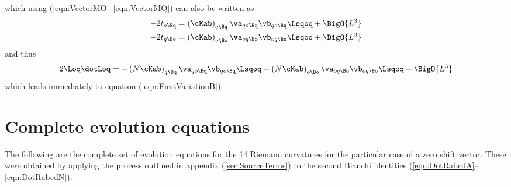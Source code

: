 \documentclass[a4paper,12pt]{article}
\numberwithin{equation}{section}
\begin{document}
which using (\ref{eqn:VectorMO}--\ref{eqn:VectorMQ}) can also be written as
\begin{align}
   -2 t_{o\Bq} &=
      \left(\cKab\right)_{q\Bq} \va_{qo\Bq} \vb_{qo\Bq} \Lsqoq
         + \BigO{L^3}\\
   -2 t_{q\Bo} &=
      \left(\cKab\right)_{o\Bo} \va_{oq\Bo} \vb_{oq\Bo} \Lsqoq
         + \BigO{L^3}
\end{align}
and thus
\begin{align}
   2\Loq\dotLoq = - \left(N \cKab\right)_{q\Bq} \va_{qo\Bq} \vb_{qo\Bq} \Lsqoq
                  - \left(N \cKab\right)_{o\Bo} \va_{oq\Bo} \vb_{oq\Bo} \Lsqoq
                  + \BigO{L^3}
\end{align}
which leads immediately to equation (\ref{eqn:FirstVariationB}).

\section{Complete evolution equations}
\label{sec:FullRiemannEqtns}

The following are the complete set of evolution equations for the 14 Riemann curvatures for
the particular case of a zero shift vector. These were obtained by applying the process
outlined in appendix (\ref{sec:SourceTerms}) to the second Bianchi identities
(\ref{eqn:DotRabcdA}--\ref{eqn:DotRabcdN}).

\end{document}
